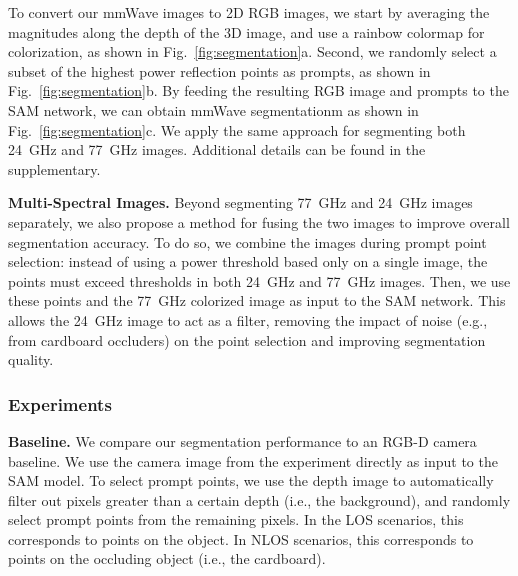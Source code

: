 To convert our mmWave images to 2D RGB images, we start by averaging the magnitudes along the depth of the 3D image, and use a rainbow colormap for colorization, as shown in Fig.~\ref{fig:segmentation}a. Second, we randomly select a subset of the highest power reflection points as prompts, as shown in Fig.~\ref{fig:segmentation}b. By feeding the resulting RGB image and prompts to the SAM network, we can obtain mmWave segmentationm as shown in Fig.~\ref{fig:segmentation}c. We apply the same approach for segmenting both 24~GHz and 77~GHz images. Additional details can be found in the supplementary.


\noindent \textbf{Multi-Spectral Images.} Beyond segmenting 77~GHz and 24~GHz images separately, we also propose a method for fusing the two images to improve overall segmentation accuracy. To do so, we combine the images during prompt point selection: instead of using a power threshold based only on a single image, the points must exceed thresholds in both 24~GHz and 77~GHz images. Then, we use these points and the 77~GHz colorized image as input to the SAM network. This allows the 24~GHz image to act as a filter, removing the impact of noise (e.g., from cardboard occluders) on the point selection and improving segmentation quality.





\subsubsection{Experiments}
\textbf{Baseline.} We compare our segmentation performance to an RGB-D camera baseline. We use the camera image from the experiment directly as input to the SAM model. To select prompt points, we use the depth image to automatically filter out pixels greater than a certain depth (i.e., the background), and randomly select prompt points from the remaining pixels. In the LOS scenarios, this corresponds to points on the object. In NLOS scenarios, this corresponds to points on the occluding object (i.e., the cardboard).   


